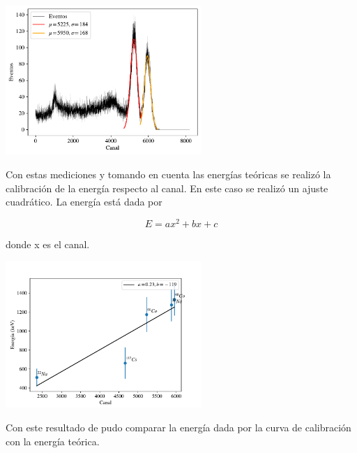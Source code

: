 \documentclass[a4paper, onecolumn]{article}
\begin{document}
		\begin{center}
			\includegraphics[width=210pt]{img/nai_33_co_60.pdf}
		\end{center}

		Con estas mediciones y tomando en cuenta las energías teóricas se realizó la calibración de la energía respecto al canal. En este caso se realizó un ajuste cuadrático. La energía está dada por

		$$
		E=ax^2+bx+c
		$$

		donde x es el canal.

		\begin{center}
			\includegraphics[width=210pt]{img/cal_nai_33.pdf}
		\end{center}

		Con este resultado de pudo comparar la energía dada por la curva de calibración con la energía teórica.
\end{document}
